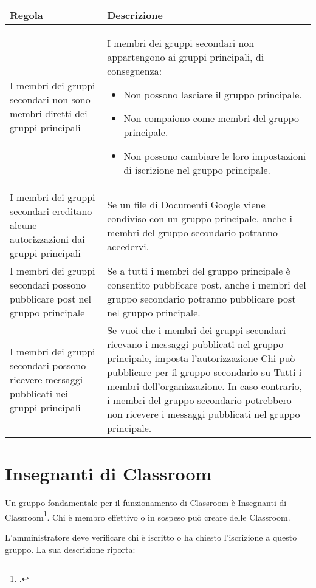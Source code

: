 \begin{center}
	\begin{tabularx}{\linewidth}{>{\setlength\hsize{.8\hsize}}X>{\setlength\hsize{\hsize}\setlength\linewidth{\hsize}}X}
\toprule	
Regola&	Descrizione\\
\midrule
I membri dei gruppi secondari non sono membri diretti dei gruppi principali	&
I membri dei gruppi secondari non appartengono ai gruppi principali, di conseguenza:
\begin{itemize}
	\item Non possono lasciare il gruppo principale.
	\item Non compaiono come membri del gruppo principale.
	\item Non possono cambiare le loro impostazioni di iscrizione nel gruppo principale.
\end{itemize}\\
I membri dei gruppi secondari ereditano alcune autorizzazioni dai gruppi principali&
Se un file di Documenti Google viene condiviso con un gruppo principale, anche i membri del gruppo secondario potranno accedervi.\\
I membri dei gruppi secondari possono pubblicare post nel gruppo principale&
Se a tutti i membri del gruppo principale è consentito pubblicare post, anche i membri del gruppo secondario potranno pubblicare post nel gruppo principale.\\
I membri dei gruppi secondari possono ricevere messaggi pubblicati nei gruppi principali&Se vuoi che i membri dei gruppi secondari ricevano i messaggi pubblicati nel gruppo principale, imposta l'autorizzazione Chi può pubblicare per il gruppo secondario su Tutti i membri dell'organizzazione. In caso contrario, i membri del gruppo secondario potrebbero non ricevere i messaggi pubblicati nel gruppo principale.\\
\bottomrule
\end{tabularx}
\end{center}
\section{Insegnanti di Classroom}
Un gruppo fondamentale per il funzionamento di Classroom è Insegnanti di Classroom\footcite{Google2023}. Chi è membro effettivo o in sospeso può creare delle Classroom. 

L'amministratore deve verificare chi è iscritto o ha chiesto l'iscrizione a questo gruppo. La sua descrizione riporta:

